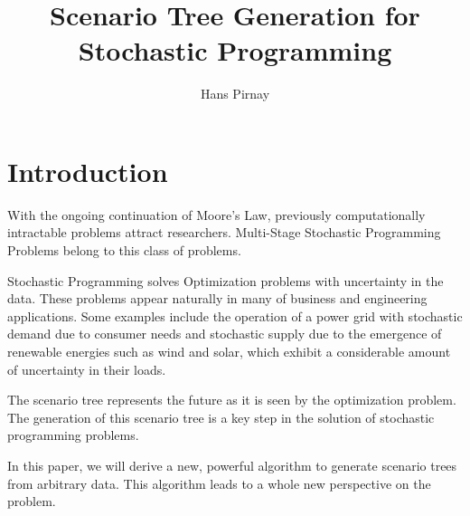 \documentclass[12pt,onecolumn,headsepline,numbers=noenddot,bibliography=totoc,oneside,a4paper,fleqn,BCOR8mm] {scrartcl}
\begin{document}
\listoftodos
\newpage
\title{Scenario Tree Generation for Stochastic Programming}
\author{Hans Pirnay}
\maketitle
\tableofcontents
\newpage
\section{Introduction}
With the ongoing continuation of Moore's Law, previously computationally intractable problems attract researchers. Multi-Stage Stochastic Programming Problems belong to this class of problems. 

Stochastic Programming solves Optimization problems with uncertainty in the data. These problems appear naturally in many of business and engineering applications. Some examples include the operation of a power grid with stochastic demand due to consumer needs and stochastic supply due to the emergence of renewable energies such as wind and solar, which exhibit a considerable amount of uncertainty in their loads.

The scenario tree represents the future as it is seen by the optimization problem.
The generation of this scenario tree is a key step in the solution of stochastic programming problems.

In this paper, we will derive a new, powerful algorithm to generate scenario trees from arbitrary data.
This algorithm leads to a whole new perspective on the problem.
\end{document}
